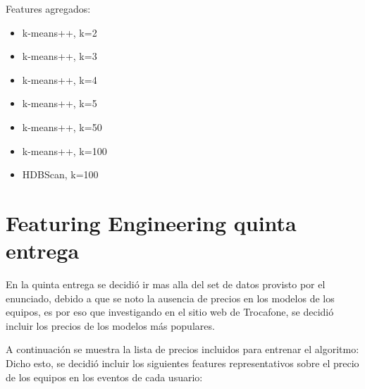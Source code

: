 \documentclass[a4paper ,12pt]{article}
\begin{document}
Features agregados:
\begin{itemize}
	\item k-means++, k=2
	\item k-means++, k=3
	\item k-means++, k=4
	\item k-means++, k=5
	\item k-means++, k=50
	\item k-means++, k=100
	\item HDBScan, k=100
\end{itemize}

\newpage
\section{Featuring Engineering quinta entrega}

En la quinta entrega se decidió ir mas alla del set de datos provisto por el enunciado, debido a que se noto la ausencia de precios en 
los modelos de los equipos, es por eso que investigando en el sitio web de Trocafone, se decidió incluir los precios de los modelos más populares.

A continuación se muestra la lista de precios incluidos para entrenar el algoritmo:
Dicho esto, se decidió incluir los siguientes features representativos sobre el precio de los equipos en los eventos de cada usuario:
\end{document}
